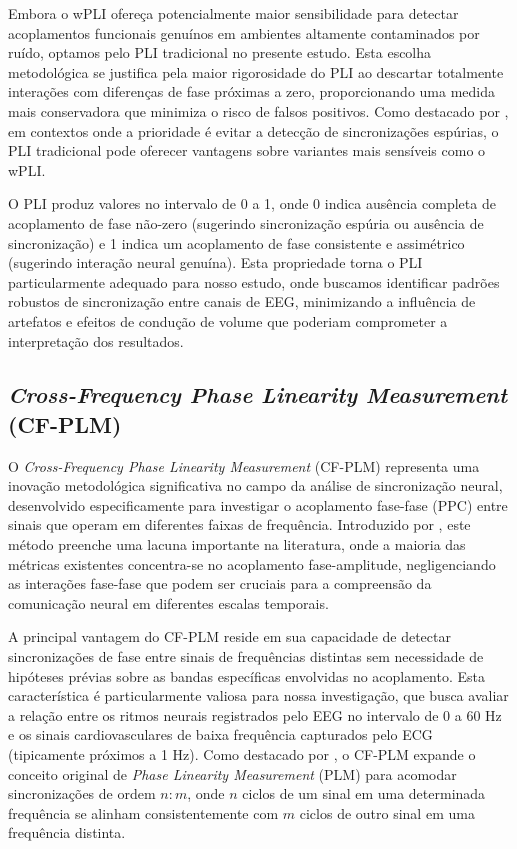 Embora o wPLI ofereça potencialmente maior sensibilidade para detectar acoplamentos funcionais genuínos em ambientes altamente contaminados por ruído, optamos pelo PLI tradicional no presente estudo. Esta escolha metodológica se justifica pela maior rigorosidade do PLI ao descartar totalmente interações com diferenças de fase próximas a zero, proporcionando uma medida mais conservadora que minimiza o risco de falsos positivos. Como destacado por , em contextos onde a prioridade é evitar a detecção de sincronizações espúrias, o PLI tradicional pode oferecer vantagens sobre variantes mais sensíveis como o wPLI.

O PLI produz valores no intervalo de 0 a 1, onde 0 indica ausência completa de acoplamento de fase não-zero (sugerindo sincronização espúria ou ausência de sincronização) e 1 indica um acoplamento de fase consistente e assimétrico (sugerindo interação neural genuína). Esta propriedade torna o PLI particularmente adequado para nosso estudo, onde buscamos identificar padrões robustos de sincronização entre canais de EEG, minimizando a influência de artefatos e efeitos de condução de volume que poderiam comprometer a interpretação dos resultados.

\subsection{\textit{Cross-Frequency Phase Linearity Measurement} (CF-PLM)}
O \textit{Cross-Frequency Phase Linearity Measurement} (CF-PLM) representa uma inovação metodológica significativa no campo da análise de sincronização neural, desenvolvido especificamente para investigar o acoplamento fase-fase (PPC) entre sinais que operam em diferentes faixas de frequência. Introduzido por , este método preenche uma lacuna importante na literatura, onde a maioria das métricas existentes concentra-se no acoplamento fase-amplitude, negligenciando as interações fase-fase que podem ser cruciais para a compreensão da comunicação neural em diferentes escalas temporais.

A principal vantagem do CF-PLM reside em sua capacidade de detectar sincronizações de fase entre sinais de frequências distintas sem necessidade de hipóteses prévias sobre as bandas específicas envolvidas no acoplamento. Esta característica é particularmente valiosa para nossa investigação, que busca avaliar a relação entre os ritmos neurais registrados pelo EEG no intervalo de 0 a 60 Hz e os sinais cardiovasculares de baixa frequência capturados pelo ECG (tipicamente próximos a 1 Hz). Como destacado por , o CF-PLM expande o conceito original de \textit{Phase Linearity Measurement} (PLM) para acomodar sincronizações de ordem \(n:m\), onde \(n\) ciclos de um sinal em uma determinada frequência se alinham consistentemente com \(m\) ciclos de outro sinal em uma frequência distinta.

